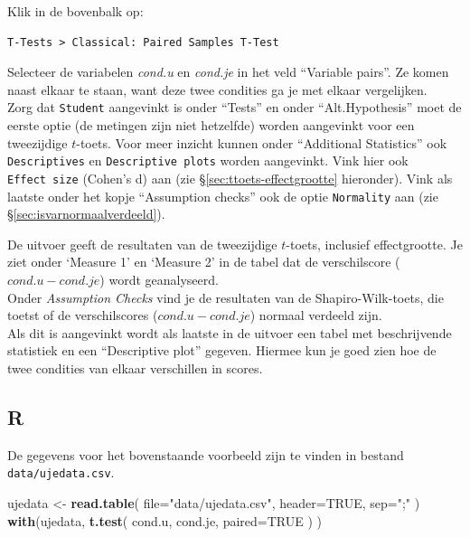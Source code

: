 \documentclass[
]{book}
\newenvironment{Shaded}{\begin{snugshade}}{\end{snugshade}}
\newcommand{\DataTypeTok}[1]{\textcolor[rgb]{0.13,0.29,0.53}{#1}}
\newcommand{\KeywordTok}[1]{\textcolor[rgb]{0.13,0.29,0.53}{\textbf{#1}}}
\newcommand{\NormalTok}[1]{#1}
\newcommand{\OtherTok}[1]{\textcolor[rgb]{0.56,0.35,0.01}{#1}}
\newcommand{\StringTok}[1]{\textcolor[rgb]{0.31,0.60,0.02}{#1}}
\begin{document}
Klik in de bovenbalk op:

\begin{verbatim}
T-Tests > Classical: Paired Samples T-Test
\end{verbatim}

Selecteer de variabelen \emph{cond.u} en \emph{cond.je} in het veld ``Variable pairs''. Ze komen naast elkaar te staan, want deze twee condities ga je met elkaar vergelijken.\\
Zorg dat \texttt{Student} aangevinkt is onder ``Tests'' en onder ``Alt.Hypothesis'' moet de eerste optie (de metingen zijn niet hetzelfde) worden aangevinkt voor een tweezijdige \(t\)-toets. Voor meer inzicht kunnen onder ``Additional Statistics'' ook \texttt{Descriptives} en \texttt{Descriptive\ plots} worden aangevinkt. Vink hier ook \texttt{Effect\ size} (Cohen's d) aan (zie §\ref{sec:ttoets-effectgrootte} hieronder). Vink als laatste onder het kopje ``Assumption checks'' ook de optie \texttt{Normality} aan (zie §\ref{sec:isvarnormaalverdeeld}).

De uitvoer geeft de resultaten van de tweezijdige \(t\)-toets, inclusief effectgrootte. Je ziet onder `Measure 1' en `Measure 2' in de tabel dat de verschilscore (\(cond.u - cond.je\)) wordt geanalyseerd.\\
Onder \emph{Assumption Checks} vind je de resultaten van de Shapiro-Wilk-toets, die toetst of de verschilscores (\(cond.u - cond.je\)) normaal verdeeld zijn.\\
Als dit is aangevinkt wordt als laatste in de uitvoer een tabel met beschrijvende statistiek en een ``Descriptive plot'' gegeven. Hiermee kun je goed zien hoe de twee condities van elkaar verschillen in scores.

\hypertarget{sec:R-ttoets-gepaard}{%
\subsection{R}\label{sec:R-ttoets-gepaard}}

De gegevens voor het bovenstaande voorbeeld zijn te vinden in bestand \texttt{data/ujedata.csv}.

\begin{Shaded}
\begin{Highlighting}[]
\NormalTok{ujedata \textless{}{-}}\StringTok{ }\KeywordTok{read.table}\NormalTok{( }\DataTypeTok{file=}\StringTok{"data/ujedata.csv"}\NormalTok{, }\DataTypeTok{header=}\OtherTok{TRUE}\NormalTok{, }\DataTypeTok{sep=}\StringTok{";"}\NormalTok{ )}
\KeywordTok{with}\NormalTok{(ujedata, }\KeywordTok{t.test}\NormalTok{( cond.u, cond.je, }\DataTypeTok{paired=}\OtherTok{TRUE}\NormalTok{ ) )}
\end{Highlighting}
\end{Shaded}
\end{document}
